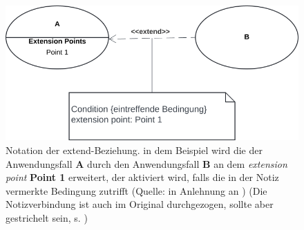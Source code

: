 \begin{figure}
    \centering
    \includegraphics[scale=0.4]{part three/Anwendungsfalldiagramm/img/usecase-extend}
    \caption{Notation der extend-Beziehung. in dem Beispiel wird die der Anwendungsfall \textbf{A} durch den Anwendungsfall \textbf{B} an dem \textit{extension point} \textbf{Point 1} erweitert, der aktiviert wird, falls die in der Notiz vermerkte Bedingung zutrifft (Quelle: in Anlehnung an \cite[65, Abb. 2.8-4]{Bal05}) (Die Notizverbindung ist auch im Original durchgezogen, sollte aber gestrichelt sein, s. \cite[``Figure 7.2 Comment notation``, 22]{OMG17})}
    \label{fig:usecase-extend-cc}
\end{figure}

